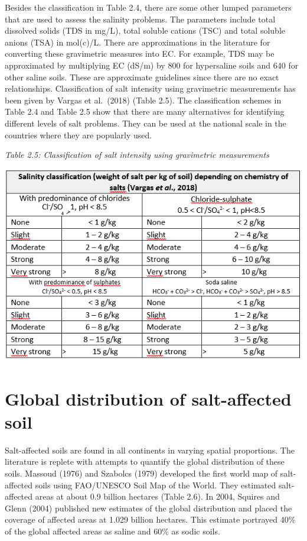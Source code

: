 \documentclass[
  10pt,
  b5paper,
]{book}
\begin{document}
Besides the classification in Table 2.4, there are some other lumped parameters that are used to assess the salinity problems. The parameters include total dissolved solids (TDS in mg/L), total soluble cations (TSC) and total soluble anions (TSA) in mol(c)/L. There are approximations in the literature for converting these gravimetric measures into EC. For example, TDS may be approximated by multiplying EC (dS/m) by 800 for hypersaline soils and 640 for other saline soils. These are approximate guidelines since there are no exact relationships. Classification of salt intensity using gravimetric measurements has been given by Vargas et al.~(2018) (Table 2.5).
The classification schemes in Table 2.4 and Table 2.5 show that there are many alternatives for identifying different levels of salt problems. They can be used at the national scale in the countries where they are popularly used.

\emph{Table 2.5: Classification of salt intensity using gravimetric measurements}

\includegraphics{figures/tables/Table_2.5.PNG}

\hypertarget{global-distribution-of-salt-affected-soil}{%
\section{Global distribution of salt-affected soil}\label{global-distribution-of-salt-affected-soil}}

Salt-affected soils are found in all continents in varying spatial proportions. The literature is replete with attempts to quantify the global distribution of these soils. Massoud (1976) and Szabolcs (1979) developed the first world map of salt-affected soils using FAO/UNESCO Soil Map of the World. They estimated salt- affected areas at about 0.9 billion hectares (Table 2.6). In 2004, Squires and Glenn (2004) published new estimates of the global distribution and placed the coverage of affected areas at 1.029 billion hectares. This estimate portrayed 40\% of the global affected areas as saline and 60\% as sodic soils.
\end{document}
